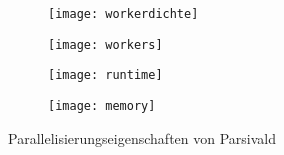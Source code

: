 \begin{figure}[H]
  \centering
  \captionsetup[subfigure]{singlelinecheck=false}
  \def\subfigwidth{7cm}
  \begin{subfigure}[t]{\subfigwidth}
    \texttt{[image: workerdichte]}
    \label{fig:goldscala-density}
  \end{subfigure}
  \hfill
  \begin{subfigure}[t]{\subfigwidth}
    \texttt{[image: workers]}
    \label{fig:goldscala-workers}
  \end{subfigure}

  \vspace{1em}

  \begin{subfigure}[t]{\subfigwidth}
    \texttt{[image: runtime]}
    \label{fig:goldscala-runtime}
  \end{subfigure}
  \hfill
  \begin{subfigure}[t]{\subfigwidth}
    \texttt{[image: memory]}
    \label{fig:goldscala-memory}
  \end{subfigure}
  \caption{Parallelisierungseigenschaften von Parsivald}
  \label{fig:goldscala}
\end{figure}
